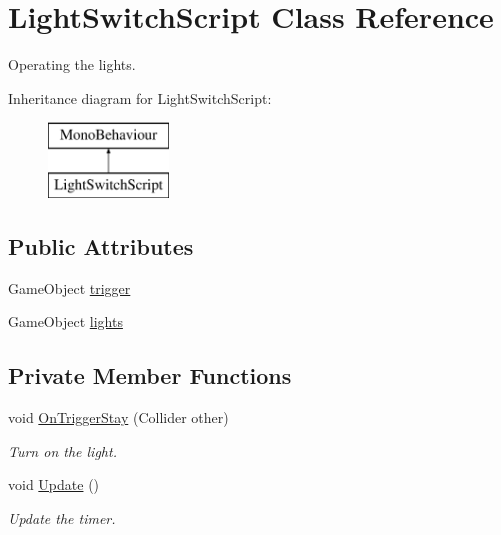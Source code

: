 \hypertarget{class_light_switch_script}{}\section{Light\+Switch\+Script Class Reference}
\label{class_light_switch_script}


Operating the lights.  


Inheritance diagram for Light\+Switch\+Script\+:\begin{figure}[H]
\begin{center}
\leavevmode
\includegraphics[height=2.000000cm]{class_light_switch_script}
\end{center}
\end{figure}
\subsection*{Public Attributes}
\begin{DoxyCompactItemize}
\item 
Game\+Object \mbox{\hyperlink{class_light_switch_script_a826fecd2be8f45bf28b77389c2a7e3ef}{trigger}}
\item 
Game\+Object \mbox{\hyperlink{class_light_switch_script_af694bcbddc86da2b19ec1a1e718a524e}{lights}}
\end{DoxyCompactItemize}
\subsection*{Private Member Functions}
\begin{DoxyCompactItemize}
\item 
void \mbox{\hyperlink{class_light_switch_script_a3a8abb43406b14adfd89d68b5bac6c79}{On\+Trigger\+Stay}} (Collider other)
\begin{DoxyCompactList}\small\item\em Turn on the light. \end{DoxyCompactList}\item 
void \mbox{\hyperlink{class_light_switch_script_a1c16d87199a05e70510aff7742bd1008}{Update}} ()
\begin{DoxyCompactList}\small\item\em Update the timer. \end{DoxyCompactList}\end{DoxyCompactItemize}
